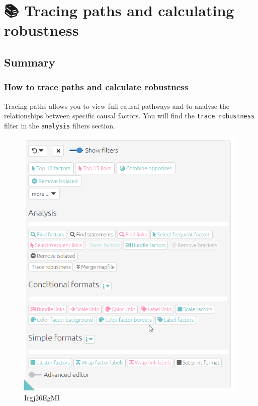 \documentclass[
]{book}
\begin{document}
\hypertarget{xrobustness}{%
\chapter{📚 Tracing paths and calculating robustness}\label{xrobustness}}

\hypertarget{summary-3}{%
\section{Summary}\label{summary-3}}

\hypertarget{howtotracepathsandrobustness}{%
\subsection{How to trace paths and calculate robustness}\label{howtotracepathsandrobustness}}

Tracing paths allows you to view full causal pathways and to analyse the relationships between specific causal factors. You will find the \texttt{trace\ robustness} filter in the \texttt{analysis} filters section.

\begin{figure}
\centering
\includegraphics[width=6.77083in,height=\textheight]{_assets/Irgj26EgMI.gif}
\caption{Irgj26EgMI}
\end{figure}
\end{document}

